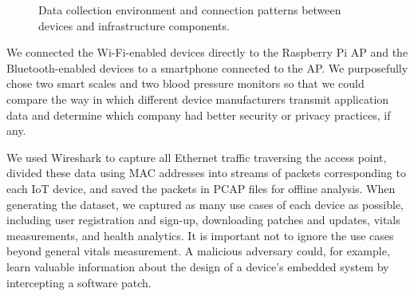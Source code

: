 \begin{figure}
  \centering
  \caption{Data collection environment and connection patterns between devices and infrastructure components.}
  \label{fig:data-collection}
\end{figure}

We connected the Wi-Fi-enabled devices directly to the Raspberry Pi AP and the Bluetooth-enabled devices to a smartphone connected to the AP.
We purposefully chose two smart scales and two blood pressure monitors so that we could compare the way in which different device manufacturers transmit application data and determine which company had better security or privacy practices, if any. 

We used Wireshark to capture all Ethernet traffic traversing the access point, divided these data using MAC addresses into streams of packets corresponding to each IoT device, and saved the packets in PCAP files for offline analysis. 
 When generating the dataset, we captured as many use cases of each device as possible, including user registration and sign-up, downloading patches and updates, vitals measurements, and health analytics. It is important not to ignore the use cases beyond general vitals measurement.  A malicious adversary could, for example, learn valuable information about the design of a device's embedded system by intercepting a software patch. 

